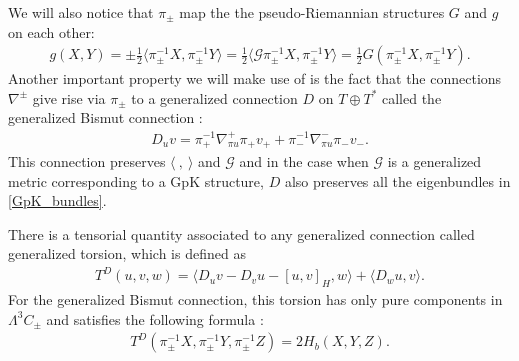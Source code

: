 \documentclass{article}
\newcommand{\TT}{{T\oplus T^*}}
\newcommand{\JJ}{\mathcal{J}}
\newcommand{\GG}{\mathcal{G}}
\newcommand{\n}{\nabla}
\newcommand{\se}{\Gamma}
\newcommand{\la}{\langle}
\newcommand{\ra}{\rangle}
\newcommand{\lara}{\la\ ,\ \ra}
\theoremstyle{definition}
\theoremstyle{remark}
\begin{document}
We will also notice that $\pi_\pm$ map the the pseudo-Riemannian structures $G$ and $g$ on each other:
\begin{align}\label{pi:gG_relationship}
g(X,Y)=\pm\frac{1}{2}\la \pi_\pm^{-1}X,\pi_\pm^{-1}Y\ra = \frac{1}{2}\la \GG \pi_\pm^{-1}X,\pi_\pm^{-1}Y\ra =\frac{1}{2}G(\pi_\pm^{-1}X,\pi_\pm^{-1}Y).
\end{align}
Another important property we will make use of is the fact that the connections $\n^\pm$ give rise via $\pi_\pm$ to a generalized connection $D$ on $\TT$ called the generalized Bismut connection \cite{Gualtieri:2007bq}:
\begin{align}\label{genBismut_pi_nabla_pm}
D_uv=\pi^{-1}_+\n^+_{\pi u}\pi_+ v_++\pi^{-1}_-\n^-_{\pi u}\pi_- v_-.
\end{align}
This connection preserves $\lara$ and $\GG$ and in the case when $\GG$ is a generalized metric corresponding to a GpK structure, $D$ also preserves all the eigenbundles in \eqref{GpK_bundles}. 

There is a tensorial quantity associated to any generalized connection called generalized torsion, which is defined as \cite{Gualtieri:2007bq}
\begin{align}\label{gentorsion_def}
T^D(u,v,w)=\la D_uv-D_vu-[u,v]_H,w\ra +\la D_wu,v\ra.
\end{align}
For the generalized Bismut connection, this torsion has only pure components in $\Lambda^3C_\pm$ and satisfies the following formula \cite[Prop.~2.29]{Hu:2019zro}:
\begin{align}\label{gentorsion_H}
T^D(\pi_\pm^{-1}X,\pi_\pm^{-1}Y,\pi_\pm^{-1}Z)=2H_b(X,Y,Z).
\end{align}


\end{document}
